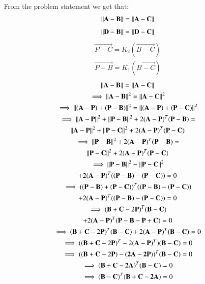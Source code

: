 From the problem statement we get that:
\begin{equation}
\begin{aligned}
\left\lVert\mathbf{A}-\mathbf{B}\right\rVert = \left\lVert\mathbf{A}-\mathbf{C}\right\rVert
\end{aligned}
\end{equation}
\label{eq:solutions/1/33/cond1}
\begin{align}
\left\lVert\mathbf{D}-\mathbf{B}\right\rVert = \left\lVert\mathbf{D}-\mathbf{C}\right\rVert
\end{align}
\label{eq:solutions/1/33/cond2}
\begin{align}
\vec{P-C} = K_2 (\vec{B-C})\\
\vec{P-B} = K_1 (\vec{B-C})
\end{align}
\begin{multline}
\left\lVert\mathbf{A-B}\right\rVert = \left\lVert\mathbf{A}-\mathbf{C}\right\rVert\\
\implies \left\lVert\mathbf{A-B}\right\rVert^2 = \left\lVert\mathbf{A-C}\right\rVert^2\\
\implies \left\lVert{(\mathbf{A-P}) + (\mathbf{P-B})}\right\rVert^2 = \left\lVert{(\mathbf{A-P}) + (\mathbf{P-C})}\right\rVert^2\\
\implies \left\lVert\mathbf{A-P}\right\rVert^2 + \left\lVert\mathbf{P-B}\right\rVert^2 + 2(\mathbf{A-P})^T (\mathbf{P-B})=\\
\left\lVert\mathbf{A-P}\right\rVert^2 + \left\lVert\mathbf{P-C}\right\rVert^2 + 2(\mathbf{A-P})^T (\mathbf{P-C})\\
\implies \left\lVert\mathbf{P-B}\right\rVert^2 + 2(\mathbf{A-P})^T (\mathbf{P-B})=\\
\left\lVert\mathbf{P-C}\right\rVert^2 + 2(\mathbf{A-P})^T (\mathbf{P-C})\\
\implies \left\lVert\mathbf{P-B}\right\rVert^2 -\left\lVert\mathbf{P-C}\right\rVert^2\\
 + 2(\mathbf{A-P})^T ((\mathbf{P-B})-(\mathbf{P-C})) =0\\
\implies ((\mathbf{P-B})+(\mathbf{P-C}))^T ((\mathbf{P-B})-(\mathbf{P-C}))\\
+ 2(\mathbf{A-P})^T ((\mathbf{P-B})-(\mathbf{P-C})) =0\\
\implies (\mathbf{B}+\mathbf{C}-2\mathbf{P})^T (\mathbf{B-C})\\
+2(\mathbf{A-P})^T (\mathbf{P}-\mathbf{B}-\mathbf{P}+\mathbf{C}) =0\\
\implies (\mathbf{B}+\mathbf{C}-2\mathbf{P})^T (\mathbf{B-C})+2(\mathbf{A-P})^T (\mathbf{B-C}) =0\\
\implies ((\mathbf{B}+\mathbf{C}-2\mathbf{P})^T - 2(\mathbf{A-P})^T)(\mathbf{B-C})=0\\
\implies ((\mathbf{B}+\mathbf{C}-2\mathbf{P})-(\mathbf{2A-2P}))^T (\mathbf{B-C})=0\\
\implies (\mathbf{B+C-2A})^T (\mathbf{B-C})=0\\
\implies (\mathbf{B-C})^T (\mathbf{B+C-2A})=0\\
\label{eq:solutions/1/33/cond3}
\end{multline}
